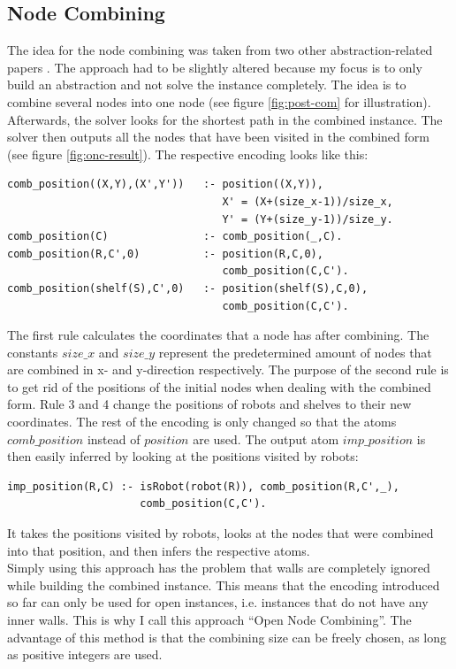 \documentclass[runningheads]{llncs}
\begin{document}
\subsection{Node Combining}
The idea for the node combining was taken from two other abstraction-related papers \cite{nc1} \cite{nc2}. The approach had to be slightly altered because my focus is to only build an abstraction and not solve the instance completely. The idea is to combine several nodes into one node (see figure \ref{fig:post-com} for illustration). Afterwards, the solver looks for the shortest path in the combined instance. The solver then outputs all the nodes that have been visited in the combined form (see figure \ref{fig:onc-result}). The respective encoding looks like this:
\begin{verbatim}
comb_position((X,Y),(X',Y'))   :- position((X,Y)),
                                  X' = (X+(size_x-1))/size_x, 
                                  Y' = (Y+(size_y-1))/size_y.
comb_position(C)               :- comb_position(_,C).
comb_position(R,C',0)          :- position(R,C,0), 
                                  comb_position(C,C').
comb_position(shelf(S),C',0)   :- position(shelf(S),C,0), 
                                  comb_position(C,C').
\end{verbatim}
The first rule calculates the coordinates that a node has after combining. The constants $size\_x$ and $size\_y$ represent the predetermined amount of nodes that are combined in x- and y-direction respectively. The purpose of the second rule is to get rid of the positions of the initial nodes when dealing with the combined form. Rule 3 and 4 change the positions of robots and shelves to their new coordinates. The rest of the encoding is only changed so that the atoms $comb\_position$ instead of $position$ are used. The output atom $imp\_position$ is then easily inferred by looking at the positions visited by robots:
\begin{verbatim}
imp_position(R,C) :- isRobot(robot(R)), comb_position(R,C',_), 
                     comb_position(C,C').
\end{verbatim}
It takes the positions visited by robots, looks at the nodes that were combined into that position, and then infers the respective atoms. \\
Simply using this approach has the problem that walls are completely ignored while building the combined instance. This means that the encoding introduced so far can only be used for open instances, i.e. instances that do not have any inner walls. This is why I call this approach ``Open Node Combining''. The advantage of this method is that the combining size can be freely chosen, as long as positive integers are used. \\
\end{document}
